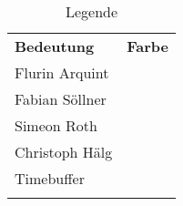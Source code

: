 \begin{landscape}
	\begin{table}[h!]
		\centering
		\begin{tabu}{|l|c|}
			\tabucline[1pt]{-}
			 \textbf{Bedeutung} & \textbf{Farbe}\\
			 \tabucline[0.5pt]{-}  \hline \hline
			 Flurin Arquint & \\ \hline
			 Fabian Söllner & \\ \hline
			 Simeon Roth & \\ \hline
			 Christoph Hälg & \\ \hline
			 Timebuffer & \\	 
			 \tabucline[1pt]{-}
		\end{tabu}
	\caption{Legende}
	\label{table:1}
	\end{table}
\end{landscape} 

